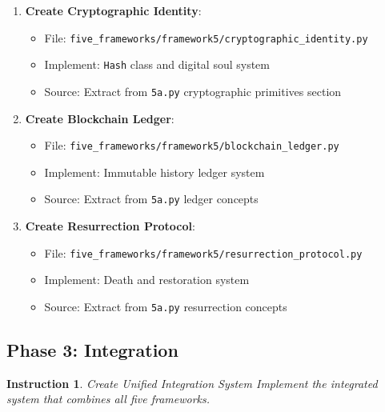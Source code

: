 \documentclass[12pt]{article}
\newtheorem{instruction}{Instruction}
\begin{document}
\begin{enumerate}
    \item \textbf{Create Cryptographic Identity}:
    \begin{itemize}
        \item File: \texttt{five\_frameworks/framework5/cryptographic\_identity.py}
        \item Implement: \texttt{Hash} class and digital soul system
        \item Source: Extract from \texttt{5a.py} cryptographic primitives section
    \end{itemize}

    \item \textbf{Create Blockchain Ledger}:
    \begin{itemize}
        \item File: \texttt{five\_frameworks/framework5/blockchain\_ledger.py}
        \item Implement: Immutable history ledger system
        \item Source: Extract from \texttt{5a.py} ledger concepts
    \end{itemize}

    \item \textbf{Create Resurrection Protocol}:
    \begin{itemize}
        \item File: \texttt{five\_frameworks/framework5/resurrection\_protocol.py}
        \item Implement: Death and restoration system
        \item Source: Extract from \texttt{5a.py} resurrection concepts
    \end{itemize}
\end{enumerate}

\subsection{Phase 3: Integration}

\begin{instruction}{Create Unified Integration System}
Implement the integrated system that combines all five frameworks.
\end{instruction}
\end{document}
